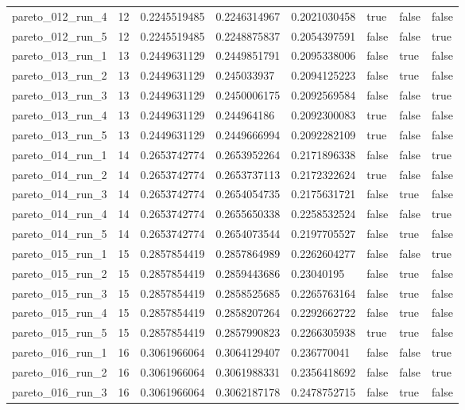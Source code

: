 \begin{tabular}{@{}llllllll@{}}
pareto\_012\_run\_4 & 12 & 0.2245519485 & 0.2246314967 & 0.2021030458 & true & false & false \\
pareto\_012\_run\_5 & 12 & 0.2245519485 & 0.2248875837 & 0.2054397591 & false & false & true \\
pareto\_013\_run\_1 & 13 & 0.2449631129 & 0.2449851791 & 0.2095338006 & false & true & false \\
pareto\_013\_run\_2 & 13 & 0.2449631129 & 0.245033937 & 0.2094125223 & false & true & false \\
pareto\_013\_run\_3 & 13 & 0.2449631129 & 0.2450006175 & 0.2092569584 & false & false & true \\
pareto\_013\_run\_4 & 13 & 0.2449631129 & 0.244964186 & 0.2092300083 & true & false & false \\
pareto\_013\_run\_5 & 13 & 0.2449631129 & 0.2449666994 & 0.2092282109 & true & false & false \\
pareto\_014\_run\_1 & 14 & 0.2653742774 & 0.2653952264 & 0.2171896338 & false & false & true \\
pareto\_014\_run\_2 & 14 & 0.2653742774 & 0.2653737113 & 0.2172322624 & true & false & false \\
pareto\_014\_run\_3 & 14 & 0.2653742774 & 0.2654054735 & 0.2175631721 & false & true & false \\
pareto\_014\_run\_4 & 14 & 0.2653742774 & 0.2655650338 & 0.2258532524 & false & false & true \\
pareto\_014\_run\_5 & 14 & 0.2653742774 & 0.2654073544 & 0.2197705527 & false & true & false \\
pareto\_015\_run\_1 & 15 & 0.2857854419 & 0.2857864989 & 0.2262604277 & false & false & true \\
pareto\_015\_run\_2 & 15 & 0.2857854419 & 0.2859443686 & 0.23040195 & false & true & false \\
pareto\_015\_run\_3 & 15 & 0.2857854419 & 0.2858525685 & 0.2265763164 & false & true & false \\
pareto\_015\_run\_4 & 15 & 0.2857854419 & 0.2858207264 & 0.2292662722 & false & true & false \\
pareto\_015\_run\_5 & 15 & 0.2857854419 & 0.2857990823 & 0.2266305938 & true & true & false \\
pareto\_016\_run\_1 & 16 & 0.3061966064 & 0.3064129407 & 0.236770041 & false & false & true \\
pareto\_016\_run\_2 & 16 & 0.3061966064 & 0.3061988331 & 0.2356418692 & false & false & true \\
pareto\_016\_run\_3 & 16 & 0.3061966064 & 0.3062187178 & 0.2478752715 & false & true & false \\

\end{tabular}
